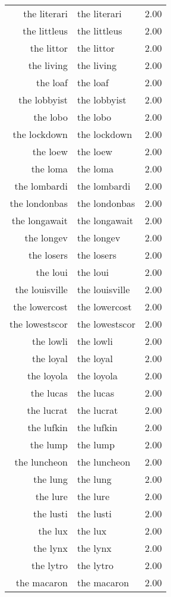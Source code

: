 \begin{table}[ht]
\begin{tabular}{rlr}
  the literari & the literari & 2.00 \\ 
  the littleus & the littleus & 2.00 \\ 
  the littor & the littor & 2.00 \\ 
  the living & the living & 2.00 \\ 
  the loaf & the loaf & 2.00 \\ 
  the lobbyist & the lobbyist & 2.00 \\ 
  the lobo & the lobo & 2.00 \\ 
  the lockdown & the lockdown & 2.00 \\ 
  the loew & the loew & 2.00 \\ 
  the loma & the loma & 2.00 \\ 
  the lombardi & the lombardi & 2.00 \\ 
  the londonbas & the londonbas & 2.00 \\ 
  the longawait & the longawait & 2.00 \\ 
  the longev & the longev & 2.00 \\ 
  the losers & the losers & 2.00 \\ 
  the loui & the loui & 2.00 \\ 
  the louisville & the louisville & 2.00 \\ 
  the lowercost & the lowercost & 2.00 \\ 
  the lowestscor & the lowestscor & 2.00 \\ 
  the lowli & the lowli & 2.00 \\ 
  the loyal & the loyal & 2.00 \\ 
  the loyola & the loyola & 2.00 \\ 
  the lucas & the lucas & 2.00 \\ 
  the lucrat & the lucrat & 2.00 \\ 
  the lufkin & the lufkin & 2.00 \\ 
  the lump & the lump & 2.00 \\ 
  the luncheon & the luncheon & 2.00 \\ 
  the lung & the lung & 2.00 \\ 
  the lure & the lure & 2.00 \\ 
  the lusti & the lusti & 2.00 \\ 
  the lux & the lux & 2.00 \\ 
  the lynx & the lynx & 2.00 \\ 
  the lytro & the lytro & 2.00 \\ 
  the macaron & the macaron & 2.00 \\ 

\end{tabular}
\end{table}
